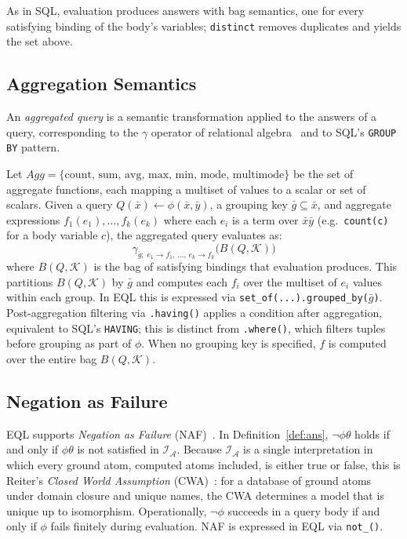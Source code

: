 \documentclass[11pt, a4paper]{article}
\theoremstyle{plain}
\theoremstyle{definition}
\theoremstyle{remark}
\begin{document}
\noindent As in SQL, evaluation produces answers with bag semantics, one for every satisfying
binding of the body's variables; \texttt{distinct} removes duplicates and yields the set above.

\subsection{Aggregation Semantics}
\label{sec:eql:aggregation}

An \emph{aggregated query} is a semantic transformation applied to the answers of a query,
corresponding to the $\gamma$ operator of relational
algebra~\cite{klug1982equivalence,abiteboul1995foundations} and to SQL's \texttt{GROUP BY}
pattern.

Let $\mathit{Agg} = \{\mathrm{count},\, \mathrm{sum},\, \mathrm{avg},\, \mathrm{max},\,
\mathrm{min},\, \mathrm{mode},\, \mathrm{multimode}\}$ be the set of aggregate functions,
each mapping a multiset of values to a scalar or set of scalars.  Given a query
$Q(\bar{x}) \leftarrow \phi(\bar{x}, \bar{y})$, a grouping key $\bar{g} \subseteq \bar{x}$,
and aggregate expressions $f_1(e_1), \ldots, f_k(e_k)$ where each $e_i$ is a term over
$\bar{x}\bar{y}$ (e.g.\ \texttt{count(c)} for a body variable $c$), the aggregated query
evaluates as:
\[
  \gamma_{\bar{g};\; e_1 \to f_1,\,\ldots,\,e_k \to f_k}
  \!\bigl(B(Q,\mathcal{K})\bigr)
\]
where $B(Q,\mathcal{K})$ is the bag of satisfying bindings that evaluation produces.  This
partitions $B(Q, \mathcal{K})$ by $\bar{g}$ and computes each $f_i$ over the multiset of $e_i$
values within each group.  In EQL this is expressed via
\texttt{set\_of(...).grouped\_by($\bar{g}$)}.  Post-aggregation filtering via
\texttt{.having()} applies a condition after aggregation, equivalent to SQL's \texttt{HAVING};
this is distinct from \texttt{.where()}, which filters tuples before grouping as part of
$\phi$.  When no grouping key is specified, $f$ is computed over the entire bag $B(Q,\mathcal{K})$.

\subsection{Negation as Failure}
\label{sec:eql:naf}

EQL supports \emph{Negation as Failure} (NAF)~\cite{clark1978negation}.  In
Definition~\ref{def:ans}, $\neg\phi\theta$ holds if and only if $\phi\theta$ is not satisfied
in $\mathcal{I}_{\mathcal{A}}$.  Because $\mathcal{I}_{\mathcal{A}}$ is a single interpretation in
which every ground atom, computed atoms included, is either true or false, this is Reiter's
\emph{Closed World Assumption} (CWA)~\cite{reiter1978closed}: for a database of ground atoms under
domain closure and unique names, the CWA determines a model that is unique up to
isomorphism.
Operationally, $\neg\phi$ succeeds in a query body if and only if $\phi$ fails finitely during
evaluation.  NAF is expressed in EQL via \texttt{not\_()}.
\end{document}
